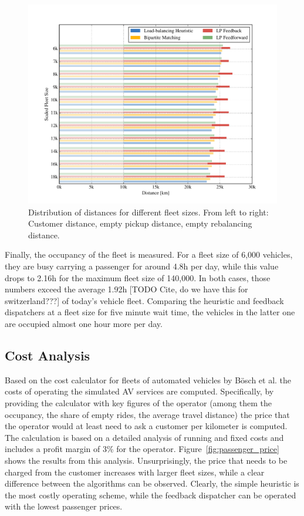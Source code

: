 \begin{figure}
\includegraphics[width=1.0\textwidth]{figures/distances.pdf}
\caption{Distribution of distances for different fleet sizes. From left to right:
Customer distance, empty pickup distance, empty rebalancing distance.}
\label{fig:distances}
\end{figure}

Finally, the occupancy of the fleet is measured. For a fleet size of 6,000
vehicles, they are busy carrying a passenger for around 4.8h per day, while
this value drops to 2.16h for the maximum fleet size of 140,000. In both cases,
those numbers exceed the average 1.92h [TODO Cite, do we have this for switzerland???] of today's vehicle fleet.
Comparing the heuristic and feedback dispatchers at a fleet size for five minute
wait time, the vehicles in the latter one are occupied almost one hour more per day.

\subsection{Cost Analysis}
\label{sec:cost_analysis}

Based on the cost calculator for fleets of automated vehicles by Bösch et al. \cite{cost_paper}
 the costs of operating the simulated
AV services are computed. Specifically, by providing the calculator with key
figures of the operator (among them the occupancy, the share of empty rides, the
average travel distance) the price that the operator would at least need to ask
a customer per kilometer is computed. The calculation
is based on a detailed analysis of running and fixed costs and includes a
profit margin of 3\% for the operator. Figure~\ref{fig:passenger_price}
shows the results from this analysis. Unsurprisingly, the price that needs to be
charged from the customer increases with larger fleet sizes, while a clear difference
between the algorithms can be observed. Clearly, the simple heuristic is the most
costly operating scheme, while the feedback dispatcher can be operated with the
lowest passenger prices.

